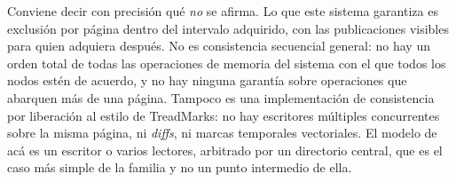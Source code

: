 Conviene decir con precisión qué \emph{no} se afirma. Lo que este sistema
garantiza es exclusión por página dentro del intervalo adquirido, con las
publicaciones visibles para quien adquiera después. No es consistencia
secuencial general: no hay un orden total de todas las operaciones de memoria
del sistema con el que todos los nodos estén de acuerdo, y no hay ninguna
garantía sobre operaciones que abarquen más de una página. Tampoco es una
implementación de consistencia por liberación al estilo de TreadMarks: no hay
escritores múltiples concurrentes sobre la misma página, ni \emph{diffs}, ni
marcas temporales vectoriales. El modelo de acá es un escritor o varios
lectores, arbitrado por un directorio central, que es el caso más simple de la
familia y no un punto intermedio de ella.
